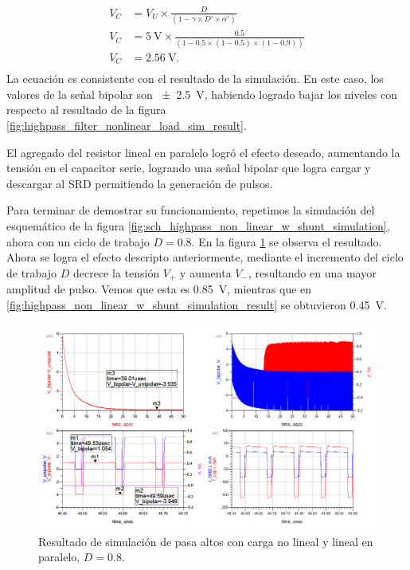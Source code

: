 \begin{equation}
    \begin{aligned}
        V_C &= V_U \times \frac{D}{\left( 1 - \gamma \times D' \times \alpha'\right)} \\
        V_C &= \qty{5}{\volt} \times \frac{0.5}{\left( 1 - 0.5 \times (1-0.5)
        \times (1-0.9) \right)} \\
        V_C &= \qty{2.56}{\volt}. \\
    \end{aligned}
\end{equation}
La ecuación es consistente con el resultado de la simulación. En este caso, los
valores de la señal bipolar son \qty{\pm2.5}{\volt}, habiendo logrado bajar los
niveles con respecto al resultado de la figura
\ref{fig:highpass_filter_nonlinear_load_sim_result}.

El agregado del resistor lineal en paralelo logró el efecto deseado, aumentando
la tensión en el capacitor serie, logrando una señal bipolar que logra cargar y
descargar al SRD permitiendo la generación de pulsos.

Para terminar de demostrar su funcionamiento, repetimos la simulación del
esquemático de la figura \ref{fig:sch_highpass_non_linear_w_shunt_simulation},
ahora con un ciclo de trabajo $D=0.8$. En la figura
\ref{fig:highpass_non_linear_w_shunt_simulation_result_80_dc} se observa el
resultado. Ahora se logra el efecto descripto anteriormente, mediante el
incremento del ciclo de trabajo $D$ decrece la tensión $V_{+}$ y aumenta
$V_{-}$, resultando en una mayor amplitud de pulso. Vemos que esta es
\qty{0.85}{\volt}, mientras que en
\ref{fig:highpass_non_linear_w_shunt_simulation_result} se obtuvieron
\qty{0.45}{\volt}.

\begin{figure}[tbp]
    \centering
    \includegraphics[width=\textwidth]{images/highpass_nonlinear_w_shunt_sim_result_80_dc.png}
    \caption{Resultado de simulación de pasa altos con carga no lineal y lineal
    en paralelo, $D=0.8$.}
    \label{fig:highpass_non_linear_w_shunt_simulation_result_80_dc}
\end{figure}

